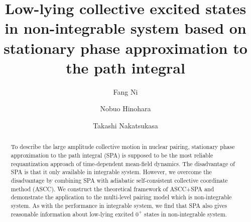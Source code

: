 \documentclass[%
superscriptaddress,
showpacs,
nofootinbib,
amsmath,amssymb,
aps,
prc,
twocolumn,
floatfix ]%
{revtex4-1}
\begin{document}
\renewcommand{\thefootnote}{\fnsymbol{footnote}}

\title{Low-lying collective excited states in non-integrable system based on stationary phase approximation to the path integral}%

\author{Fang Ni}
\author{Nobuo Hinohara}
\author{Takashi Nakatsukasa}

\begin{abstract}
To describe the large amplitude collective motion in nuclear pairing, stationary phase approximation to the path integral (SPA) is supposed to be the most reliable requantization approach of time-dependent mean-field dynamics. The disadvantage of SPA is that it only available in integrable system. However, we overcome the disadvantage by combining SPA with adiabatic self-consistent collective coordinate method (ASCC). We construct the theoretical framework of  ASCC+SPA and demonstrate the application to the multi-level pairing model which is non-integrable system. As with the performance in integrable system, we find that SPA also gives reasonable information about low-lying excited $0^+$ states in non-integrable system.
\end{abstract}

\maketitle
\end{document}
